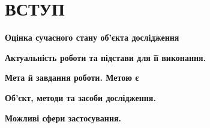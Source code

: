 \chapter*{ВСТУП}

\textbf{Оцінка сучасного стану об’єкта дослідження}


\textbf{Актуальність роботи та підстави для її виконання.}


\textbf{Мета й завдання роботи. Метою є}


\textbf{Об'єкт, методи та засоби дослідження.}

\textbf{Можливі сфери застосування.}

